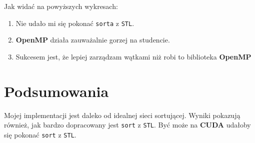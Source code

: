 \documentclass{article}
\begin{document}
Jak widać na powyższych wykresach:
\begin{enumerate}
\item Nie udało mi się pokonać \texttt{sorta} z \texttt{STL}.
\item \textbf{OpenMP} działa zauważalnie gorzej na studencie.
\item Sukcesem jest, że lepiej zarządzam wątkami niż robi to biblioteka \textbf{OpenMP}
\end{enumerate}

\section*{Podsumowania}
Mojej implementacji jest daleko od idealnej sieci sortującej. Wyniki pokazują również, jak bardzo dopracowany jest \texttt{sort} z \texttt{STL}. Być może na \textbf{CUDA} udałoby się pokonać \texttt{sort} z \texttt{STL}.
\end{document}
